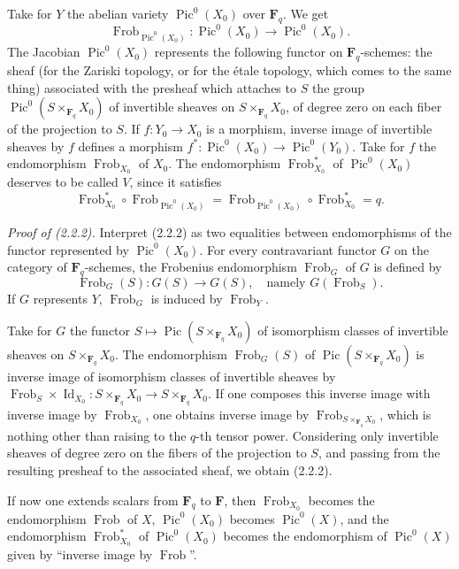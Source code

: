 \documentclass[11pt]{article}
\newcommand{\Fq}{\mathbf{F}_q}
\newcommand{\F}{\mathbf{F}}
\newcommand{\Frob}{\operatorname{Frob}}
\newcommand{\Pic}{\operatorname{Pic}}
\newcommand{\Id}{\operatorname{Id}}
\begin{document}
Take for \(Y\) the abelian variety \(\Pic^0(X_0)\) over \(\Fq\). We get
\begin{equation}
\Frob_{\Pic^0(X_0)}:\Pic^0(X_0)\longrightarrow \Pic^0(X_0).
\tag{2.2.1}
\end{equation}
The Jacobian \(\Pic^0(X_0)\) represents the following functor on \(\Fq\)-schemes: the sheaf (for the Zariski topology, or for the étale topology, which comes to the same thing) associated with the presheaf which attaches to \(S\) the group \(\Pic^0(S\times_{\Fq}X_0)\) of invertible sheaves on \(S\times_{\Fq}X_0\), of degree zero on each fiber of the projection to \(S\). If \(f:Y_0\to X_0\) is a morphism, inverse image of invertible sheaves by \(f\) defines a morphism \(f^*:\Pic^0(X_0)\to\Pic^0(Y_0)\). Take for \(f\) the endomorphism \(\Frob_{X_0}\) of \(X_0\). The endomorphism \(\Frob^*_{X_0}\) of \(\Pic^0(X_0)\) deserves to be called \(V\), since it satisfies
\begin{equation}
\Frob^*_{X_0}\circ \Frob_{\Pic^0(X_0)}=\Frob_{\Pic^0(X_0)}\circ \Frob^*_{X_0}=q.
\tag{2.2.2}
\end{equation}

\noindent\textit{Proof of (2.2.2).} Interpret (2.2.2) as two equalities between endomorphisms of the functor represented by \(\Pic^0(X_0)\). For every contravariant functor \(G\) on the category of \(\Fq\)-schemes, the Frobenius endomorphism \(\Frob_G\) of \(G\) is defined by
\[
\Frob_G(S):G(S)\to G(S),\quad \text{namely }G(\Frob_S).
\]
If \(G\) represents \(Y\), \(\Frob_G\) is induced by \(\Frob_Y\).

Take for \(G\) the functor \(S\mapsto\Pic(S\times_{\Fq}X_0)\) of isomorphism classes of invertible sheaves on \(S\times_{\Fq}X_0\). The endomorphism \(\Frob_G(S)\) of \(\Pic(S\times_{\Fq}X_0)\) is inverse image of isomorphism classes of invertible sheaves by \(\Frob_S\times\Id_{X_0}:S\times_{\Fq}X_0\to S\times_{\Fq}X_0\). If one composes this inverse image with inverse image by \(\Frob_{X_0}\), one obtains inverse image by \(\Frob_{S\times_{\Fq}X_0}\), which is nothing other than raising to the \(q\)-th tensor power. Considering only invertible sheaves of degree zero on the fibers of the projection to \(S\), and passing from the resulting presheaf to the associated sheaf, we obtain (2.2.2).

If now one extends scalars from \(\Fq\) to \(\F\), then \(\Frob_{X_0}\) becomes the endomorphism \(\Frob\) of \(X\), \(\Pic^0(X_0)\) becomes \(\Pic^0(X)\), and the endomorphism \(\Frob^*_{X_0}\) of \(\Pic^0(X_0)\) becomes the endomorphism of \(\Pic^0(X)\) given by ``inverse image by \(\Frob\)''.
\end{document}
